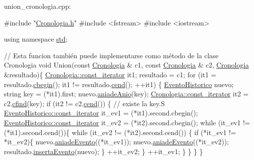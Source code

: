  union\+\_\+cronologia.\+cpp\+: 
\begin{DoxyCodeInclude}

\textcolor{preprocessor}{#include "\hyperlink{Cronologia_8h}{Cronologia.h}"}
\textcolor{preprocessor}{#include <fstream>}
\textcolor{preprocessor}{#include <iostream>}

\textcolor{keyword}{using namespace }\hyperlink{namespacestd}{std};

\textcolor{comment}{// Esta funcion también puede implementarse como método de la clase Cronologia}
\textcolor{keywordtype}{void} Union(\textcolor{keyword}{const} \hyperlink{classCronologia}{Cronologia} & c1, \textcolor{keyword}{const} \hyperlink{classCronologia}{Cronologia} & c2, 
      \hyperlink{classCronologia}{Cronologia} &resultado)\{
  \hyperlink{classCronologia_1_1const__iterator}{Cronologia::const\_iterator} it1;
  resultado = c1;
  \textcolor{keywordflow}{for} (it1 = resultado.\hyperlink{classCronologia_a7457f94493f66fdd906f9c2cae44732b}{cbegin}(); it1 != resultado.\hyperlink{classCronologia_afc9925e321be957f47312184af813d09}{cend}(); ++it1) \{
    \hyperlink{classEventoHistorico}{EventoHistorico} nuevo;
    \textcolor{keywordtype}{string} key = (*it1).first;
    nuevo.\hyperlink{classEventoHistorico_ad7bb99f4afa1b283f965a5ed378a5c14}{aniadeAnio}(key);
    \hyperlink{classCronologia_1_1const__iterator}{Cronologia::const\_iterator} it2 = c2.\hyperlink{classCronologia_a24cb1afe568a8fccd6694485601d58c5}{cfind}(key);
    \textcolor{keywordflow}{if} (it2 != c2.\hyperlink{classCronologia_afc9925e321be957f47312184af813d09}{cend}()) \{    \textcolor{comment}{// existe la key.S}
      \hyperlink{classEventoHistorico_1_1const__iterator}{EventoHistorico::const\_iterator} it\_ev1 = (*it1).second.cbegin();
      \hyperlink{classEventoHistorico_1_1const__iterator}{EventoHistorico::const\_iterator} it\_ev2 = (*it2).second.cbegin();
      \textcolor{keywordflow}{while} (it\_ev1 != (*it1).second.cend())\{
        \textcolor{keywordflow}{while} (it\_ev2 != (*it2).second.cend()) \{
          \textcolor{keywordflow}{if} (*it\_ev1 != *it\_ev2)\{
            nuevo.\hyperlink{classEventoHistorico_aedda8393e5c52b32ee3c3a5cbd58ab37}{aniadeEvento}((*it\_ev1));
            nuevo.\hyperlink{classEventoHistorico_aedda8393e5c52b32ee3c3a5cbd58ab37}{aniadeEvento}((*it\_ev2));
            resultado.\hyperlink{classCronologia_a006c5d809c17d50d255bb5b6456a4776}{insertaEvento}(nuevo);
          \}
          ++it\_ev2;
        \}
        ++it\_ev1;
      \}
    \}
  \}
\}


\end{DoxyCodeInclude}
